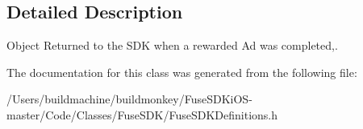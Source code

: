 \subsection{Detailed Description}
Object Returned to the S\+D\+K when a rewarded Ad was completed,. 

The documentation for this class was generated from the following file\+:\begin{DoxyCompactItemize}
\item 
/\+Users/buildmachine/buildmonkey/\+Fuse\+S\+D\+Ki\+O\+S-\/master/\+Code/\+Classes/\+Fuse\+S\+D\+K/Fuse\+S\+D\+K\+Definitions.\+h\end{DoxyCompactItemize}
